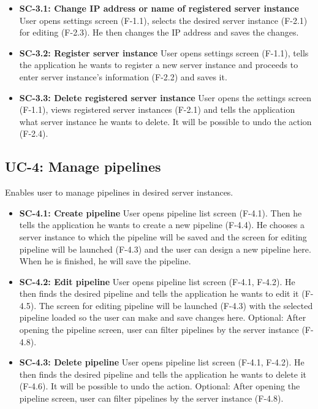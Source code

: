 \begin{itemize}
\item \textbf{SC-3.1: Change IP address or name of registered server instance}
User opens settings screen (F-1.1), selects the desired server instance (F-2.1) for editing (F-2.3). He then changes the IP address and saves the changes.

\item \textbf{SC-3.2: Register server instance}
User opens settings screen (F-1.1), tells the application he wants to register a new server instance and proceeds to enter server instance's information (F-2.2) and saves it.

\item \textbf{SC-3.3: Delete registered server instance}
User opens the settings screen (F-1.1), views registered server instances (F-2.1) and tells the application what server instance he wants to delete. It will be possible to undo the action (F-2.4).

\end{itemize}

\subsection*{UC-4: Manage pipelines}
Enables user to manage pipelines in desired server instances.

\begin{itemize}
\item \textbf{SC-4.1: Create pipeline}
User opens pipeline list screen (F-4.1). Then he tells the application he wants to create a new pipeline (F-4.4). He chooses a server instance to which the pipeline will be saved and the screen for editing pipeline will be launched (F-4.3) and the user can design a new pipeline here. When he is finished, he will save the pipeline.

\item \textbf{SC-4.2: Edit pipeline}
User opens pipeline list screen (F-4.1, F-4.2). He then finds the desired pipeline and tells the application he wants to edit it (F-4.5). The screen for editing pipeline will be launched (F-4.3) with the selected pipeline loaded so the user can make and save changes here. Optional: After opening the pipeline screen, user can filter pipelines by the server instance (F-4.8).

\item \textbf{SC-4.3: Delete pipeline}
User opens pipeline list screen (F-4.1, F-4.2). He then finds the desired pipeline and tells the application he wants to delete it (F-4.6). It will be possible to undo the action. Optional: After opening the pipeline screen, user can filter pipelines by the server instance (F-4.8).

\end{itemize}

